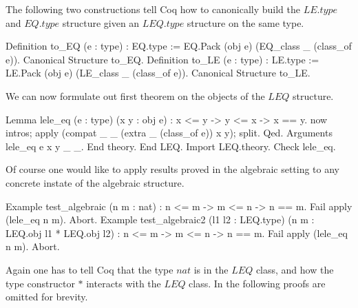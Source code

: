 The following two constructions tell Coq how to canonically build
the $LE.type$ and $EQ.type$ structure given an $LEQ.type$ structure
on the same type.

\begin{coq_example}
  Definition to_EQ (e : type) : EQ.type :=
    EQ.Pack (obj e) (EQ_class _ (class_of e)).
  Canonical Structure to_EQ.
  Definition to_LE (e : type) : LE.type :=
    LE.Pack (obj e) (LE_class _ (class_of e)).
  Canonical Structure to_LE.
\end{coq_example}
We can now formulate out first theorem on the objects of the $LEQ$ structure.
\begin{coq_example}
  Lemma lele_eq (e : type) (x y : obj e) : x <= y -> y <= x -> x == y.
   now intros; apply (compat _ _ (extra _ (class_of e)) x y); split. Qed.
  Arguments lele_eq {e} x y _ _.
  End theory.
End LEQ.
Import LEQ.theory.
Check lele_eq.
\end{coq_example}

Of course one would like to apply results proved in the algebraic
setting to any concrete instate of the algebraic structure.

\begin{coq_example}
Example test_algebraic (n m : nat) :  n <= m -> m <= n -> n == m.
 Fail apply (lele_eq n m). Abort.
Example test_algebraic2 (l1 l2 : LEQ.type) (n m : LEQ.obj l1 * LEQ.obj l2) :
  n <= m -> m <= n -> n == m.
 Fail apply (lele_eq n m). Abort.
\end{coq_example}

Again one has to tell Coq that the type $nat$ is in the $LEQ$ class, and how
the type constructor $*$ interacts with the $LEQ$ class.  In the following
proofs are omitted for brevity.

